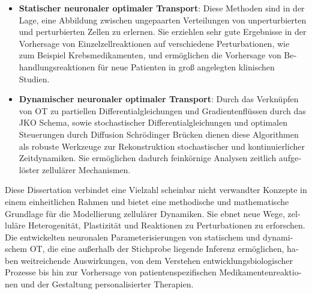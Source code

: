 \begin{otherlanguage}{ngerman}
\begin{itemize}[leftmargin=*]
	\item \textbf{Statischer neuronaler optimaler Transport}: 
	Diese Methoden sind in der Lage, eine Abbildung zwischen ungepaarten Verteilungen von unperturbierten und perturbierten Zellen zu erlernen. Sie erziehlen sehr gute Ergebnisse in der Vorhersage von Einzelzellreaktionen auf verschiedene Perturbationen, wie zum Beispiel Krebsmedikamenten, und erm{\"o}glichen die Vorhersage von Behandlungsreaktionen f{\"u}r neue Patienten in gro{\ss} angelegten klinischen Studien.

	\item \textbf{Dynamischer neuronaler optimaler Transport}: 
	Durch das Verkn{\"u}pfen von OT zu partiellen Differentialgleichungen und Gradientenfl{\"u}ssen durch das \acrfull{JKO} Schema, sowie stochastischer Differentialgleichungen und optimalen Steuerungen durch Diffusion Schr{\"o}dinger Br{\"u}cken dienen diese Algorithmen als robuste Werkzeuge zur Rekonstruktion stochastischer und kontinuierlicher Zeitdynamiken. Sie erm{\"o}glichen dadurch feink{\"o}rnige Analysen zeitlich aufgel{\"o}ster zellul{\"a}rer Mechanismen.
\end{itemize}

Diese Dissertation verbindet eine Vielzahl scheinbar nicht verwandter Konzepte in einem einheitlichen Rahmen und bietet eine methodische und mathematische Grundlage f{\"u}r die Modellierung zellul{\"a}rer Dynamiken. 
Sie ebnet neue Wege, zellul{\"a}re Heterogenit{\"a}t, Plastizit{\"a}t und Reaktionen zu Perturbationen zu erforschen. Die entwickelten neuronalen Parameterisierungen von statischem und dynamischem OT, die eine au{\ss}erhalb der Stichprobe liegende Inferenz erm{\"o}glichen, haben weitreichende Auswirkungen, von dem Verstehen entwicklungsbiologischer Prozesse bis hin zur Vorhersage von patientenspezifischen Medikamentenreaktionen und der Gestaltung personalisierter Therapien.


\end{otherlanguage}
